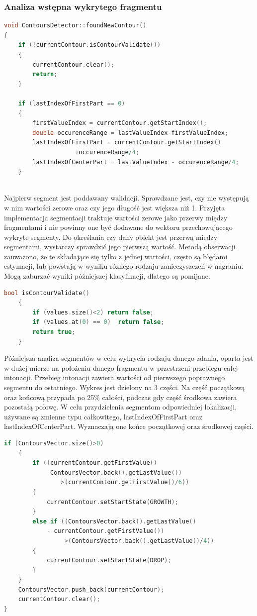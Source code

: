 \documentclass[a4paper,12 pt]{article}
\begin{document}
\subsubsection{Analiza wstępna wykrytego fragmentu}
\begin{lstlisting}[caption={Funkcja zajmująca się analizą wstępną wykrytego segmentu},label={lst:label},language=C++]
void ContoursDetector::foundNewContour()
{
    if (!currentContour.isContourValidate())
    {
        currentContour.clear();
        return;
    }
    
    if (lastIndexOfFirstPart == 0)
    {
        firstValueIndex = currentContour.getStartIndex();
        double occurenceRange = lastValueIndex-firstValueIndex;
        lastIndexOfFirstPart = currentContour.getStartIndex()
					+occurenceRange/4;
        lastIndexOfCenterPart = lastValueIndex - occurenceRange/4;
    }
                
\end{lstlisting}
Najpierw segment jest poddawany walidacji. Sprawdzane jest, czy nie występują w nim wartości zerowe oraz czy jego długość jest większa niż 1. Przyjęta implementacja segmentacji traktuje wartości zerowe jako przerwy między fragmentami i nie powinny one być dodawane do wektoru przechowującego wykryte segmenty. Do określania czy dany obiekt jest przerwą między segmentami, wystarczy sprawdzić jego pierwszą wartość.
Metodą obserwacji zauważono, że te składające się tylko z jednej wartości, często są błędami estymacji, lub powstają w wyniku róznego rodzaju zanieczyszczeń w nagraniu. Mogą zaburzać wyniki późniejszej klasyfikacji, dlatego są pomijane.
\begin{lstlisting}[caption={Funkcja dokonująca walidacji segmentu},label={lst:label},language=C++]
    bool isContourValidate()
    {
        if (values.size()<2) return false;
        if (values.at(0) == 0)  return false;
        return true;
    }
\end{lstlisting}
Póżniejsza analiza segmentów w celu wykrycia rodzaju danego zdania, oparta jest w dużej mierze na położeniu danego fragmentu w przestrzeni przebiegu całej intonacji. Przebieg intonacji zawiera wartości od pierwszego poprawnego segmentu do ostatniego. Wykres jest dzielony na 3 części. Na część początkową oraz końcową przypada po 25\% całości, podczas gdy część środkowa zawiera pozostałą połowę.
W celu przydzielenia segmentom odpowiedniej lokalizacji, używane są zmienne typu całkowitego, lastIndexOfFirstPart oraz lastIndexOfCenterPart. Wyznaczają one końce początkowej oraz środkowej części.
\begin{lstlisting}[caption={Dalsza część funkcji foundNewContour},label={lst:label},language=C++]
     if (ContoursVector.size()>0)
    {
        if ((currentContour.getFirstValue()
        	-ContoursVector.back().getLastValue())
                >(currentContour.getFirstValue()/6))
        {
            currentContour.setStartState(GROWTH);
        }
        else if ((ContoursVector.back().getLastValue() 
        	- currentContour.getFirstValue())
                 >(ContoursVector.back().getLastValue()/4))
        {
            currentContour.setStartState(DROP);
        }
    }
    ContoursVector.push_back(currentContour);
    currentContour.clear();
}
\end{lstlisting}
\end{document}
